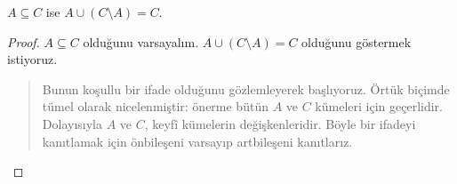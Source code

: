 



\begin{prop}
$A \subseteq C$ ise $A \cup (C \setminus A) = C$.
\end{prop}

\begin{proof}
  $A \subseteq C$ olduğunu varsayalım. $A \cup (C \setminus A) = C$
  olduğunu göstermek istiyoruz.
  \begin{quote}
    Bunun koşullu bir ifade olduğunu gözlemleyerek başlıyoruz. Örtük
    biçimde tümel olarak nicelenmiştir: önerme bütün $A$ ve $C$ kümeleri
    için geçerlidir. Dolayısıyla $A$ ve $C$, keyfî kümelerin
    değişkenleridir. Böyle bir ifadeyi kanıtlamak için önbileşeni
    varsayıp artbileşeni kanıtlarız.


\end{quote}
\end{proof}
